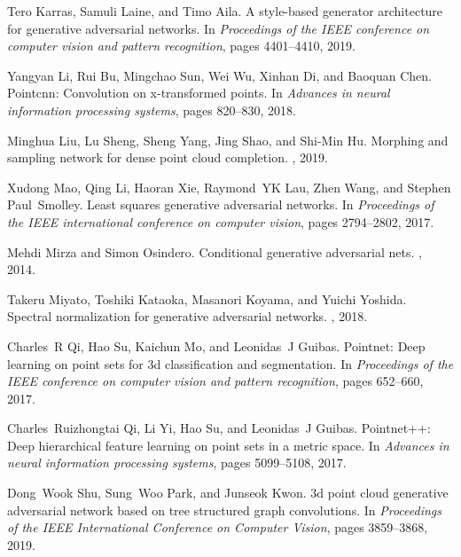 \documentclass[final]{cvpr}
\begin{document}
{\begin{thebibliography}{10}
Tero Karras, Samuli Laine, and Timo Aila.
\newblock A style-based generator architecture for generative adversarial
  networks.
\newblock In {\em Proceedings of the IEEE conference on computer vision and
  pattern recognition}, pages 4401--4410, 2019.

Yangyan Li, Rui Bu, Mingchao Sun, Wei Wu, Xinhan Di, and Baoquan Chen.
\newblock Pointcnn: Convolution on x-transformed points.
\newblock In {\em Advances in neural information processing systems}, pages
  820--830, 2018.

Minghua Liu, Lu Sheng, Sheng Yang, Jing Shao, and Shi-Min Hu.
\newblock Morphing and sampling network for dense point cloud completion.
, 2019.

Xudong Mao, Qing Li, Haoran Xie, Raymond~YK Lau, Zhen Wang, and Stephen
  Paul~Smolley.
\newblock Least squares generative adversarial networks.
\newblock In {\em Proceedings of the IEEE international conference on computer
  vision}, pages 2794--2802, 2017.

Mehdi Mirza and Simon Osindero.
\newblock Conditional generative adversarial nets.
, 2014.

Takeru Miyato, Toshiki Kataoka, Masanori Koyama, and Yuichi Yoshida.
\newblock Spectral normalization for generative adversarial networks.
, 2018.

Charles~R Qi, Hao Su, Kaichun Mo, and Leonidas~J Guibas.
\newblock Pointnet: Deep learning on point sets for 3d classification and
  segmentation.
\newblock In {\em Proceedings of the IEEE conference on computer vision and
  pattern recognition}, pages 652--660, 2017.

Charles~Ruizhongtai Qi, Li Yi, Hao Su, and Leonidas~J Guibas.
\newblock Pointnet++: Deep hierarchical feature learning on point sets in a
  metric space.
\newblock In {\em Advances in neural information processing systems}, pages
  5099--5108, 2017.

Dong~Wook Shu, Sung~Woo Park, and Junseok Kwon.
\newblock 3d point cloud generative adversarial network based on tree
  structured graph convolutions.
\newblock In {\em Proceedings of the IEEE International Conference on Computer
  Vision}, pages 3859--3868, 2019.


\end{thebibliography}}
\end{document}
